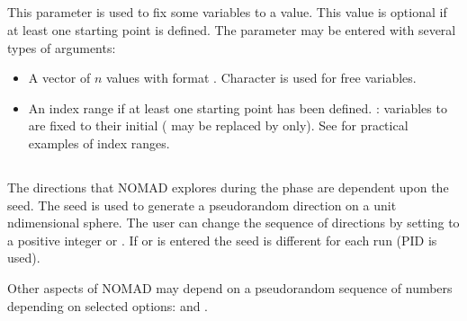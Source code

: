 \documentclass[letterpaper,10pt,english]{sphinxmanual}
\begin{document}
\subsection{}
\label{\detokenize{AdvancedFunctionalities:fixed-variable}}\label{\detokenize{AdvancedFunctionalities:id3}}
\sphinxAtStartPar
This parameter is used to fix some variables to a value.
This value is optional if at least one starting point is defined.
The parameter may be entered with several types of arguments:
\begin{itemize}
\item {} 
\sphinxAtStartPar
A vector of \(n\) values with format . Character \sphinxcode{\sphinxupquote{\sphinxhyphen{}}} is used for free variables.

\item {} 
\sphinxAtStartPar
An index range if at least one starting point has been defined. : variables  to 
are fixed to their initial ( may be replaced by  only). See {\hyperref[\detokenize{HowToUseNomad:x0}]{}} for practical examples of index ranges.

\end{itemize}


\subsection{}
\label{\detokenize{AdvancedFunctionalities:seed}}\label{\detokenize{AdvancedFunctionalities:id4}}
\sphinxAtStartPar
The directions that NOMAD explores during the  phase are dependent upon the seed.
The seed is used to generate a pseudo\sphinxhyphen{}random direction on a unit n\sphinxhyphen{}dimensional sphere.
The user can change the sequence of directions by setting  to a positive integer or . If  or  is entered the seed is different for each run (PID is used).

\sphinxAtStartPar
Other aspects of NOMAD may depend on a pseudo\sphinxhyphen{}random sequence of numbers depending on selected options:  and .
\end{document}
